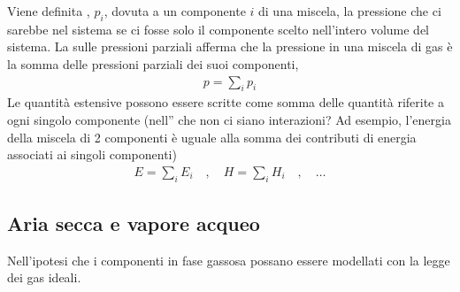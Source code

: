 \documentclass[letterpaper,10pt,italian]{jupyterBook}
\begin{document}
\sphinxAtStartPar
Viene definita , \(p_i\), dovuta a un componente \(i\) di una miscela, la pressione che ci sarebbe nel sistema se ci fosse solo il componente scelto nell’intero volume del sistema. La  sulle pressioni parziali afferma che la pressione in una miscela di gas è la somma delle pressioni parziali dei suoi componenti,
\begin{equation*}
\begin{split}p = \sum_i p_i\end{split}
\end{equation*}
\sphinxAtStartPar
Le quantità estensive possono essere scritte come somma delle quantità riferite a ogni singolo componente (nell” che non ci siano interazioni? Ad esempio, l’energia della miscela di 2 componenti è uguale alla somma dei contributi di energia associati ai singoli componenti)
\begin{equation*}
\begin{split}E = \sum_i E_i \quad , \quad H = \sum_i H_i \quad , \quad \dots\end{split}
\end{equation*}

\subsection{Aria secca e vapore acqueo}
\label{\detokenize{ch/thermodynamics/humid-air:aria-secca-e-vapore-acqueo}}
\sphinxAtStartPar
Nell’ipotesi che i componenti in fase gassosa possano essere modellati con la legge dei gas ideali.
\end{document}

